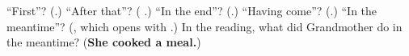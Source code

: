\begin{tcolorbox}[breakable,colback=teal!4,colframe=teal!35!black,title={Before you move on}]
\textquotedblleft{}First\textquotedblright{}? (\textbf{}.) \textquotedblleft{}After that\textquotedblright{}? (\textbf{ }.) \textquotedblleft{}In the end\textquotedblright{}? (\textbf{}.) \textquotedblleft{}Having come\textquotedblright{}? (\textbf{}.) \textquotedblleft{}In the meantime\textquotedblright{}? (\textbf{}, which opens with \textbf{}.) In the reading, what did Grandmother do in the meantime? (\textbf{She cooked a meal.})
\end{tcolorbox}
